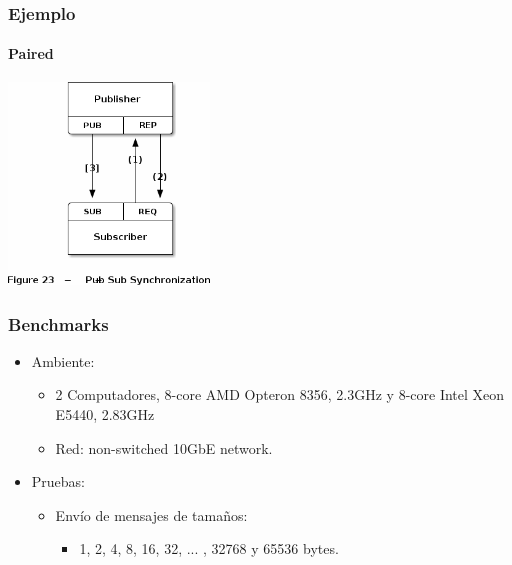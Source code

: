 \begin{frame}
    \begin{center}
        \vspace{1cm}
            \Huge {}\\
            \Large {}
    \end{center}
\end{frame}

\begin{frame}
    \frametitle{Ejemplo}
    \framesubtitle{Paired}
    \begin{center}
        \includegraphics[width=0.4\textwidth]{img/nodecoord}
    \end{center}
\end{frame}



\begin{frame}
    \frametitle{Benchmarks}
    \begin{itemize}
        \item Ambiente:
        \begin{itemize}
            \item 2 Computadores, 8-core AMD Opteron 8356, 2.3GHz y 8-core Intel Xeon E5440, 2.83GHz
            \item Red: non-switched 10GbE network.
        \end{itemize}
        \item Pruebas:
        \begin{itemize}
            \item Envío de mensajes de tamaños:
             \begin{itemize}
                 \item 1, 2, 4, 8, 16, 32, ... , 32768 y 65536 bytes.
             \end{itemize}
        \end{itemize}
    \end{itemize}
\end{frame}

